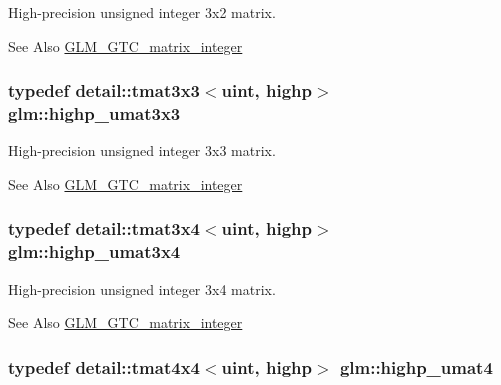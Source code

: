 High-\/precision unsigned integer 3x2 matrix. \begin{DoxySeeAlso}{See Also}
\hyperlink{group__gtc__matrix__integer}{G\-L\-M\-\_\-\-G\-T\-C\-\_\-matrix\-\_\-integer} 
\end{DoxySeeAlso}
\hypertarget{group__gtc__matrix__integer_ga8dd9f8bfe06de34c8f1a942d2c2e094c}{
\subsubsection[{highp\-\_\-umat3x3}]{\setlength{\rightskip}{0pt plus 5cm}typedef detail\-::tmat3x3$<$uint, highp$>$ {\bf glm\-::highp\-\_\-umat3x3}}}\label{group__gtc__matrix__integer_ga8dd9f8bfe06de34c8f1a942d2c2e094c}
High-\/precision unsigned integer 3x3 matrix. \begin{DoxySeeAlso}{See Also}
\hyperlink{group__gtc__matrix__integer}{G\-L\-M\-\_\-\-G\-T\-C\-\_\-matrix\-\_\-integer} 
\end{DoxySeeAlso}
\hypertarget{group__gtc__matrix__integer_gabaeb2363acd07cc7f99918bae48ccc05}{
\subsubsection[{highp\-\_\-umat3x4}]{\setlength{\rightskip}{0pt plus 5cm}typedef detail\-::tmat3x4$<$uint, highp$>$ {\bf glm\-::highp\-\_\-umat3x4}}}\label{group__gtc__matrix__integer_gabaeb2363acd07cc7f99918bae48ccc05}
High-\/precision unsigned integer 3x4 matrix. \begin{DoxySeeAlso}{See Also}
\hyperlink{group__gtc__matrix__integer}{G\-L\-M\-\_\-\-G\-T\-C\-\_\-matrix\-\_\-integer} 
\end{DoxySeeAlso}
\hypertarget{group__gtc__matrix__integer_gaf12f0d2744e809e64469d27ef392aa98}{
\subsubsection[{highp\-\_\-umat4}]{\setlength{\rightskip}{0pt plus 5cm}typedef detail\-::tmat4x4$<$uint, highp$>$ {\bf glm\-::highp\-\_\-umat4}}}\label{group__gtc__matrix__integer_gaf12f0d2744e809e64469d27ef392aa98}

